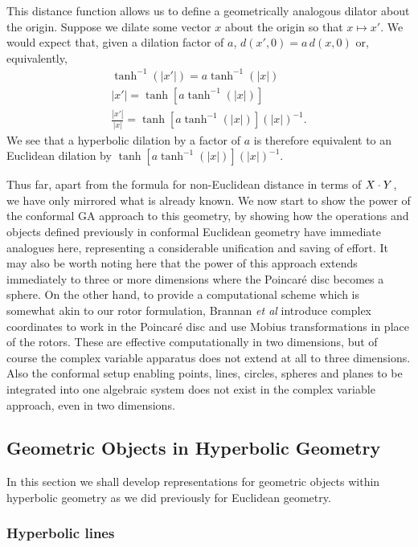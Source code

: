 This distance function allows us to define a geometrically analogous
dilator about the origin. Suppose we dilate some vector $x$ about the
origin so that $x \mapsto x'$. We would expect that, given a dilation
factor of $a$, $d(x',0) = a\,d(x,0)$ or, equivalently,
\begin{eqnarray*}
\tanh^{-1}(|x'|) = a \tanh^{-1}(|x|) \\
|x'| = \tanh[ a \tanh^{-1}(|x|) ] \\
\frac{|x'|}{|x|} = {\tanh[ a \tanh^{-1}(|x|) ]}({|x|})^{-1}.
\end{eqnarray*}
We see that a hyperbolic dilation by a factor of $a$ is therefore
equivalent to an Euclidean dilation by ${\tanh[ a \tanh^{-1}(|x|) ]}({|x|})^{-1}$.

Thus far, apart from the formula for non-Euclidean
distance in terms of $X \cdot Y$, we have only mirrored
what is already known. We now start to show the power of
the conformal GA approach to this geometry, by showing
how the operations and objects defined previously in
conformal Euclidean geometry have immediate analogues
here, representing a considerable unification and saving
of effort. It may also be worth noting here that the
power of this approach extends immediately to three or more
dimensions where the Poincar\'e
disc becomes a sphere. On the other hand, to provide a
computational scheme which is somewhat akin to our rotor
formulation, Brannan \emph{et al} \cite{GEOM:Brannan} introduce complex coordinates
to work in the Poincar\'e disc and use Mobius
transformations in place of the rotors. These are
effective computationally in two dimensions, but of course the
complex variable apparatus does not extend at all to three dimensions.
Also the
conformal setup enabling points, lines, circles, spheres
and planes to be integrated into one algebraic system
does not exist in the complex variable approach, even in
two dimensions.

\subsection{Geometric Objects in Hyperbolic Geometry}

In this section we shall develop representations for geometric objects
within hyperbolic geometry as we did previously for Euclidean geometry.

\subsubsection{Hyperbolic lines}

